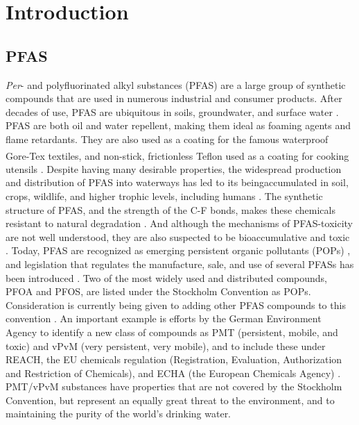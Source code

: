 \chapter{Introduction}\label{chap:intro}

\section{PFAS}
\textit{Per}- and polyfluorinated alkyl substances (PFAS) are a large group of synthetic compounds that are used in numerous industrial and consumer products. After decades of use, PFAS are ubiquitous in soils, groundwater, and surface water \citep{rankin2016north}. PFAS are both oil and water repellent, making them ideal as foaming agents and flame retardants. They are also used as a coating for the famous waterproof Gore-Tex\textsuperscript{\textregistered} textiles, and non-stick, frictionless Teflon\textsuperscript{\texttrademark} used as a coating for cooking utensils \citep{du2014adsorption}. Despite having many desirable properties, the widespread production and distribution of PFAS into waterways has led to its beingaccumulated in soil, crops, wildlife, and higher trophic levels, including humans \citep{bhhatarai2011,Lau2007}. The synthetic structure of PFAS, and the strength of the C-F bonds, makes these chemicals resistant to natural degradation \citep{krafft2015per}. And although the mechanisms of PFAS-toxicity are not well understood, they are also suspected to be bioaccumulative and toxic \citep{ding2013physicochemical,Lau2007}. Today, PFAS are recognized as emerging persistent organic pollutants (POPs) \citep{ECHA2020}, and legislation that regulates the manufacture, sale, and use of several PFASs has been introduced  \citep{EPA2014,EC2020PFAS,goldenman2017study}. Two of the most widely used and distributed compounds, PFOA and PFOS, are listed under the Stockholm Convention as \acrshort{POPs}. Consideration is currently being given to adding other PFAS compounds to this convention \citep{EC2020PFAS}. An important example is efforts by the German Environment Agency to identify a new class of compounds as PMT (persistent, mobile, and toxic) and vPvM (very persistent, very mobile), and to include these under REACH, the EU chemicals regulation (Registration, Evaluation, Authorization and Restriction of Chemicals), and ECHA (the European Chemicals Agency) \citep{hale2020persistent}. \acrshort{PMT}/\acrshort{vPvM} substances have properties that are not covered by the Stockholm Convention, but represent an equally great threat to the environment, and to maintaining the purity of the world's drinking water.


